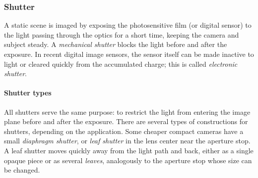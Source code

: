 

\subsubsection{Shutter} %


A static scene is imaged by exposing the photosensitive film (or digital sensor) to the light passing through the optics for a short time, keeping the camera and subject steady.
A \emph{mechanical shutter} blocks the light before and after the exposure.
\cite{greenleaf1950photographic}
In recent digital image sensors, the sensor itself can be made inactive to light or cleared quickly from the accumulated charge; this is called \emph{electronic shutter}.
\cite{caspeelectronic,kodakshutter}





\paragraph{Shutter types}
All shutters serve the same purpose: to restrict the light from entering the image plane before and after the exposure.
There are several types of constructions for shutters, depending on the application.
Some cheaper compact cameras have a small \emph{diaphragm shutter}, or \emph{leaf shutter} in the lens center near the aperture stop.
A leaf shutter moves quickly away from the light path and back, either as a single opaque piece or as several \emph{leaves}, analogously to the aperture stop whose size can be changed.
\cite{greenleaf1950photographic}

